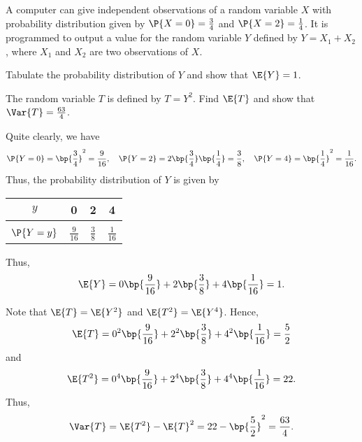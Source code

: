\begin{problem}
    A computer can give independent observations of a random variable $X$ with probability distribution given by $\P{X = 0} = \frac34$ and $\P{X = 2} = \frac14$. It is programmed to output a value for the random variable $Y$ defined by $Y = X_1 + X_2$, where $X_1$ and $X_2$ are two observations of $X$.

    Tabulate the probability distribution of $Y$ and show that $\E{Y} = 1$.

    The random variable $T$ is defined by $T = Y^2$. Find $\E{T}$ and show that $\Var{T} = \frac{63}{4}$.
\end{problem}
\begin{solution}
    Quite clearly, we have \[\P{Y = 0} = \bp{\frac34}^2 = \frac9{16}, \quad \P{Y = 2} = 2\bp{\frac34}\bp{\frac14} = \frac38, \quad \P{Y = 4} = \bp{\frac14}^2 = \frac1{16}.\] Thus, the probability distribution of $Y$ is given by
    \begin{table}[H]
        \centering
        \begin{tabular}{|c|c|c|c|}
        \hline
        $y$ & 0 & 2 & 4  \\ \hline
        &&&\\[-1em]
        $\P{Y = y}$ & $\frac9{16}$ & $\frac38$ & $\frac1{16}$ \\[0.2em] \hline
        \end{tabular}
    \end{table}
    Thus, \[\E{Y} = 0\bp{\frac9{16}} + 2\bp{\frac38} + 4\bp{\frac1{16}} = 1.\]

    Note that $\E{T} = \E{Y^2}$ and $\E{T^2} = \E{Y^4}$. Hence, \[\E{T} = 0^2\bp{\frac9{16}} + 2^2\bp{\frac38} + 4^2\bp{\frac1{16}} = \frac52\] and \[\E{T^2} = 0^4\bp{\frac9{16}} + 2^4\bp{\frac38} + 4^4\bp{\frac1{16}} = 22.\] Thus, \[\Var{T} = \E{T^2} - \E{T}^2 = 22 - \bp{\frac52}^2 = \frac{63}4.\]
\end{solution}

